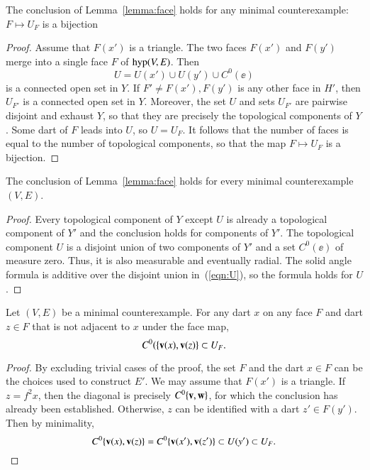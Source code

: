 \begin{lemma}
The conclusion  of Lemma~\ref{lemma:face}  holds for any minimal counterexample:
$F\mapsto U_F$ is a bijection
\end{lemma}

\begin{proof}
Assume that $F(x')$ is a triangle.
The two faces $F(x')$ and $F(y')$ merge into a single face $F$ of ${\operatorname{hyp}}(V,E)$.
Then 
\begin{equation}\label{eqn:U}
U= U(x')\cup U(y')\cup C^0(\ee)
\end{equation} 
is a connected open set in $Y$.
If $F'\ne F(x'),F(y')$ is any other face in $H'$, then $U_{F'}$ is
a connected open set in $Y$.  Moreover, the set $U$ and sets $U_{F'}$
are pairwise disjoint and exhaust $Y$, so that they are precisely the topological
components of $Y$.  Some dart of $F$ leads into $U$, so $U=U_F$.  It follows
that the number of faces is equal to the number of topological components, so that the map $F\mapsto U_F$ is a bijection.
\end{proof}


\begin{lemma}  The conclusion  of Lemma~\ref{lemma:face} holds for every minimal counterexample $(V,E)$.
\end{lemma}

\begin{proof} Every topological component of $Y$ 
except $U$ is already a topological component of $Y'$ and the conclusion
holds for components of $Y'$.  The topological component $U$ is a disjoint union of two
components of $Y'$ and a set $C^0(\ee)$ of measure zero.  Thus, it
is also measurable and eventually radial.  The solid angle formula is
additive over the disjoint union in~(\ref{eqn:U}), so the formula holds for $U$.
\end{proof}
%


\begin{lemma}  Let $(V,E)$ be a minimal counterexample.  For any dart $x$ on any face $F$ and dart $z\in F$ that is not adjacent to $x$ under the face map, 
$$
C^0(\{{\mathbf v}(x),{\mathbf v}(z)\} \subset U_F.
$$
\end{lemma}

\begin{proof}  By excluding trivial cases of the proof,  the set $F$ and the dart $x\in F$ can be the choices used to construct $E'$.
We may assume that $F(x')$ is a triangle.
If $z=f^2x$, then the diagonal is precisely $C^0\{{\mathbf v},{\mathbf w}\}$,
for which the conclusion has already been established.  Otherwise, $z$ can be identified with
a dart $z'\in F(y')$.  Then by minimality,
$$
C^0\{{\mathbf v}(x),{\mathbf v}(z)\} = C^0\{{\mathbf v}(x'),{\mathbf v}(z')\} \subset U(y') \subset U_F.
$$
\end{proof}

